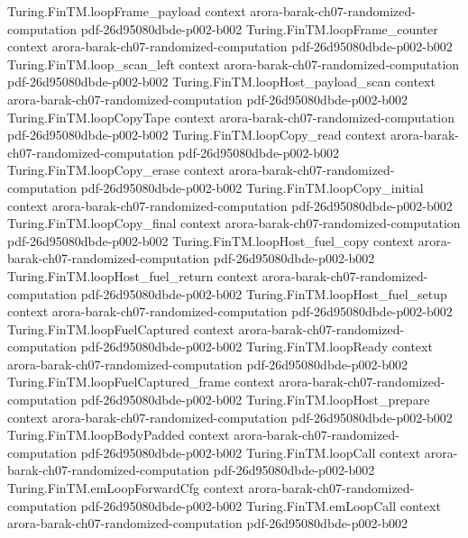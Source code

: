 \begin{theorem}
\proofstep
  {Turing.FinTM.loopFrame_payload}
  {context}
  {arora-barak-ch07-randomized-computation}
  {pdf-26d95080dbde-p002-b002}
\proofstep
  {Turing.FinTM.loopFrame_counter}
  {context}
  {arora-barak-ch07-randomized-computation}
  {pdf-26d95080dbde-p002-b002}
\proofstep
  {Turing.FinTM.loop_scan_left}
  {context}
  {arora-barak-ch07-randomized-computation}
  {pdf-26d95080dbde-p002-b002}
\proofstep
  {Turing.FinTM.loopHost_payload_scan}
  {context}
  {arora-barak-ch07-randomized-computation}
  {pdf-26d95080dbde-p002-b002}
\proofstep
  {Turing.FinTM.loopCopyTape}
  {context}
  {arora-barak-ch07-randomized-computation}
  {pdf-26d95080dbde-p002-b002}
\proofstep
  {Turing.FinTM.loopCopy_read}
  {context}
  {arora-barak-ch07-randomized-computation}
  {pdf-26d95080dbde-p002-b002}
\proofstep
  {Turing.FinTM.loopCopy_erase}
  {context}
  {arora-barak-ch07-randomized-computation}
  {pdf-26d95080dbde-p002-b002}
\proofstep
  {Turing.FinTM.loopCopy_initial}
  {context}
  {arora-barak-ch07-randomized-computation}
  {pdf-26d95080dbde-p002-b002}
\proofstep
  {Turing.FinTM.loopCopy_final}
  {context}
  {arora-barak-ch07-randomized-computation}
  {pdf-26d95080dbde-p002-b002}
\proofstep
  {Turing.FinTM.loopHost_fuel_copy}
  {context}
  {arora-barak-ch07-randomized-computation}
  {pdf-26d95080dbde-p002-b002}
\proofstep
  {Turing.FinTM.loopHost_fuel_return}
  {context}
  {arora-barak-ch07-randomized-computation}
  {pdf-26d95080dbde-p002-b002}
\proofstep
  {Turing.FinTM.loopHost_fuel_setup}
  {context}
  {arora-barak-ch07-randomized-computation}
  {pdf-26d95080dbde-p002-b002}
\proofstep
  {Turing.FinTM.loopFuelCaptured}
  {context}
  {arora-barak-ch07-randomized-computation}
  {pdf-26d95080dbde-p002-b002}
\proofstep
  {Turing.FinTM.loopReady}
  {context}
  {arora-barak-ch07-randomized-computation}
  {pdf-26d95080dbde-p002-b002}
\proofstep
  {Turing.FinTM.loopFuelCaptured_frame}
  {context}
  {arora-barak-ch07-randomized-computation}
  {pdf-26d95080dbde-p002-b002}
\proofstep
  {Turing.FinTM.loopHost_prepare}
  {context}
  {arora-barak-ch07-randomized-computation}
  {pdf-26d95080dbde-p002-b002}
\proofstep
  {Turing.FinTM.loopBodyPadded}
  {context}
  {arora-barak-ch07-randomized-computation}
  {pdf-26d95080dbde-p002-b002}
\proofstep
  {Turing.FinTM.loopCall}
  {context}
  {arora-barak-ch07-randomized-computation}
  {pdf-26d95080dbde-p002-b002}
\proofstep
  {Turing.FinTM.emLoopForwardCfg}
  {context}
  {arora-barak-ch07-randomized-computation}
  {pdf-26d95080dbde-p002-b002}
\proofstep
  {Turing.FinTM.emLoopCall}
  {context}
  {arora-barak-ch07-randomized-computation}
  {pdf-26d95080dbde-p002-b002}

\end{theorem}
